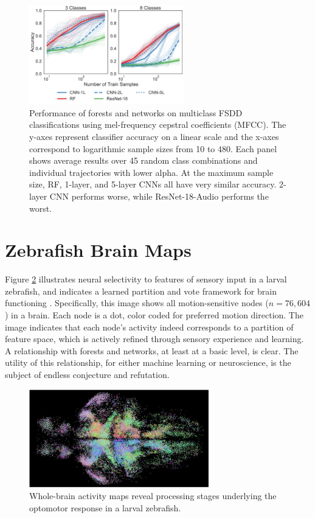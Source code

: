 \begin{figure}[!htb]
\centering
\includegraphics[width=0.6\textwidth]{figures/mfcc.pdf}
  \caption{Performance of forests and networks on multiclass FSDD classifications using mel-frequency cepstral coefficients (MFCC). 
  The y-axes represent classifier accuracy on a linear scale and the x-axes correspond to logarithmic sample sizes from 10 to 480. Each panel shows average results over 45 random class combinations and individual trajectories with lower alpha.
  At the maximum sample size, RF, 1-layer, and 5-layer CNNs all have very similar accuracy. 2-layer CNN performs worse, while ResNet-18-Audio performs the worst.
  }
\label{fig:mfcc}
\end{figure}
\clearpage

\section{Zebrafish Brain Maps}
\label{app:brains}
Figure \ref{fig:fluorian} illustrates neural selectivity to features of sensory input in a larval zebrafish, and indicates a learned partition and vote framework for brain functioning \citep{Naumann2016-oc}.
Specifically, this image shows all motion-sensitive nodes ($n = 76,604$) in a brain. Each node is a dot, color coded for preferred motion direction.
The image indicates that each node's activity indeed corresponds to a partition of feature space, which is actively refined through sensory experience and learning.
A relationship with forests and networks, at least at a basic level, is clear.
The utility of this relationship, for either machine learning or neuroscience, is the subject of endless conjecture and refutation.

\begin{figure}[h!]
\centering
\includegraphics[width=0.7\textwidth]{figures/fish.jpg}
  \caption{Whole-brain activity maps reveal processing stages underlying the optomotor response in a larval zebrafish.
  }
\label{fig:fluorian}
\end{figure}
\clearpage
